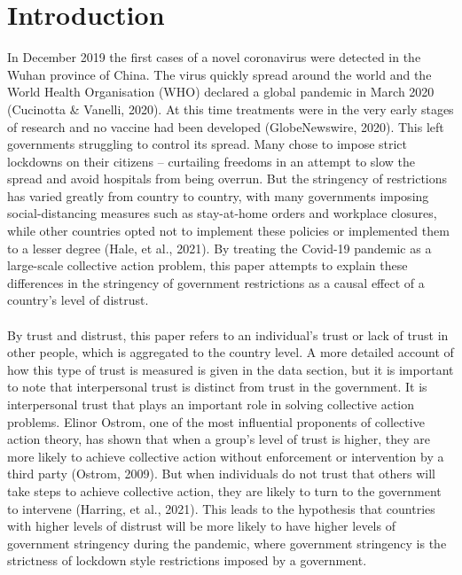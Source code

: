 \documentclass[
  12pt,
]{article}
\begin{document}
\clearpage
\tableofcontents
{} 
\newpage
{}

\hypertarget{introduction}{%
\section{Introduction}\label{introduction}}

In December 2019 the first cases of a novel coronavirus were detected in the Wuhan province of China. The virus quickly spread around the world and the World Health Organisation (WHO) declared a global pandemic in March 2020 (Cucinotta \& Vanelli, 2020). At this time treatments were in the very early stages of research and no vaccine had been developed (GlobeNewswire, 2020). This left governments struggling to control its spread. Many chose to impose strict lockdowns on their citizens -- curtailing freedoms in an attempt to slow the spread and avoid hospitals from being overrun. But the stringency of restrictions has varied greatly from country to country, with many governments imposing social-distancing measures such as stay-at-home orders and workplace closures, while other countries opted not to implement these policies or implemented them to a lesser degree (Hale, et al., 2021). By treating the Covid-19 pandemic as a large-scale collective action problem, this paper attempts to explain these differences in the stringency of government restrictions as a causal effect of a country's level of distrust.\\
~\\
By trust and distrust, this paper refers to an individual's trust or lack of trust in other people, which is aggregated to the country level. A more detailed account of how this type of trust is measured is given in the data section, but it is important to note that interpersonal trust is distinct from trust in the government. It is interpersonal trust that plays an important role in solving collective action problems. Elinor Ostrom, one of the most influential proponents of collective action theory, has shown that when a group's level of trust is higher, they are more likely to achieve collective action without enforcement or intervention by a third party (Ostrom, 2009). But when individuals do not trust that others will take steps to achieve collective action, they are likely to turn to the government to intervene (Harring, et al., 2021). This leads to the hypothesis that countries with higher levels of distrust will be more likely to have higher levels of government stringency during the pandemic, where government stringency is the strictness of lockdown style restrictions imposed by a government.\\
\end{document}
